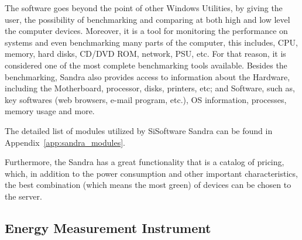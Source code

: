     The software goes beyond the point of other Windows Utilities, by giving the user, the possibility of benchmarking and comparing at both high and low level the computer devices. Moreover, it is a tool for monitoring the performance on systems and even benchmarking many parts of the computer, this includes, CPU, memory, hard disks, CD/DVD ROM, network, PSU, etc. For that reason, it is considered one of the most complete benchmarking tools available. Besides the benchmarking, Sandra also provides access to information about the Hardware, including the Motherboard, processor, disks, printers, etc; and Software, such as, key softwares (web browsers, e-mail program, etc.), OS information, processes, memory usage and more.
    
    The detailed list of modules utilized by SiSoftware Sandra can be found in Appendix~\ref{app:sandra_modules}.
    
    Furthermore, the Sandra has a great functionality that is a catalog of pricing, which, in addition to the power consumption and other important characteristics, the best combination (which means the most green) of devices can be chosen to the server.
    
    \subsection{Energy Measurement Instrument} \label{sec3:energy_measurement_instrument}

